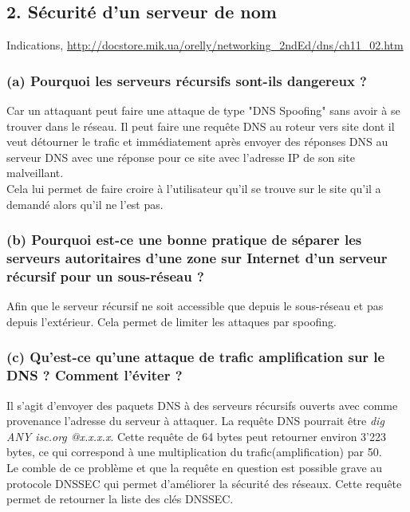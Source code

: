 \documentclass{article}
\begin{document}
\subsection*{2. Sécurité d’un serveur de nom}
Indications,  \url{http://docstore.mik.ua/orelly/networking_2ndEd/dns/ch11_02.htm}

\subsubsection*{(a) Pourquoi les serveurs récursifs sont-ils dangereux ?}
Car un attaquant peut faire une attaque de type "DNS Spoofing" sans avoir à se trouver dans le réseau. Il peut faire une requête DNS au roteur vers site dont il veut détourner le trafic et immédiatement après envoyer des réponses DNS au serveur DNS avec une réponse pour ce site avec l'adresse IP de son site malveillant.\\

Cela lui permet de faire croire à l'utilisateur qu'il se trouve sur le site qu'il a demandé alors qu'il ne l'est pas.

\subsubsection*{(b) Pourquoi est-ce une bonne pratique de séparer les serveurs autoritaires d’une zone sur Internet d’un serveur récursif pour un sous-réseau ?}
Afin que le serveur récursif ne soit accessible que depuis le sous-réseau et pas depuis l'extérieur. Cela permet de limiter les attaques par spoofing.

\subsubsection*{(c) Qu’est-ce qu’une attaque de trafic amplification sur le DNS ? Comment l’éviter ?}
Il s'agit d'envoyer des paquets DNS à des serveurs récursifs ouverts avec comme provenance l'adresse du serveur à attaquer. La requête DNS pourrait être \textit{dig ANY isc.org @x.x.x.x}. Cette requête de 64 bytes peut retourner environ 3'223 bytes, ce qui correspond à une multiplication du  trafic(amplification) par 50.\cite{DDOS}\cite{amplification}\cite{attaques}\\

Le comble de ce problème et que la requête en question est possible grave au protocole DNSSEC qui permet d'améliorer la sécurité des réseaux. Cette requête permet de retourner la liste des clés DNSSEC.\\
\end{document}
